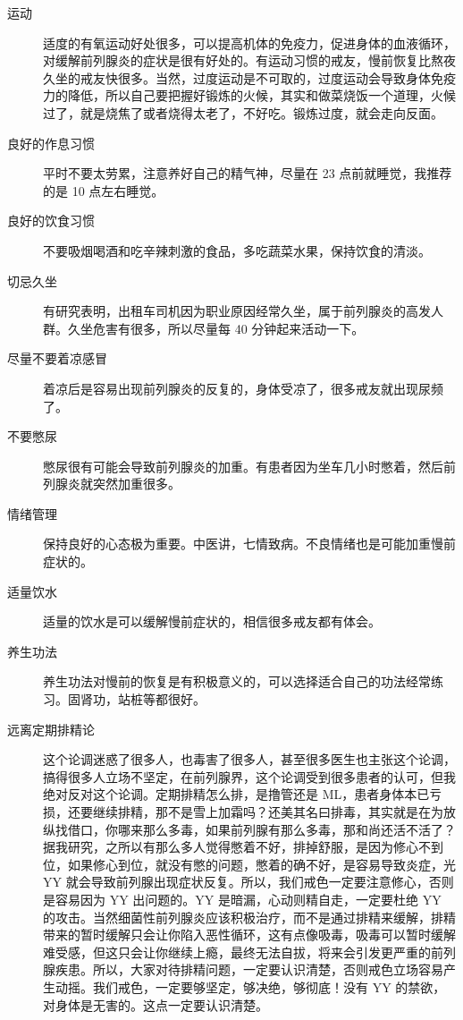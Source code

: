 \documentclass[fontset=founder]{ctexart}
\begin{document}
\begin{description}
    \item [运动] 适度的有氧运动好处很多，可以提高机体的免疫力，促进身体的血液循环，对缓解前列腺炎的症状是很有好处的。有运动习惯的戒友，慢前恢复比熬夜久坐的戒友快很多。当然，过度运动是不可取的，过度运动会导致身体免疫力的降低，所以自己要把握好锻炼的火候，其实和做菜烧饭一个道理，火候过了，就是烧焦了或者烧得太老了，不好吃。锻炼过度，就会走向反面。
    \item [良好的作息习惯] 平时不要太劳累，注意养好自己的精气神，尽量在 23 点前就睡觉，我推荐的是 10 点左右睡觉。
    \item [良好的饮食习惯] 不要吸烟喝酒和吃辛辣刺激的食品，多吃蔬菜水果，保持饮食的清淡。
    \item [切忌久坐] 有研究表明，出租车司机因为职业原因经常久坐，属于前列腺炎的高发人群。久坐危害有很多，所以尽量每 40 分钟起来活动一下。
    \item [尽量不要着凉感冒] 着凉后是容易出现前列腺炎的反复的，身体受凉了，很多戒友就出现尿频了。
    \item [不要憋尿] 憋尿很有可能会导致前列腺炎的加重。有患者因为坐车几小时憋着，然后前列腺炎就突然加重很多。
    \item [情绪管理] 保持良好的心态极为重要。中医讲，七情致病。不良情绪也是可能加重慢前症状的。
    \item [适量饮水] 适量的饮水是可以缓解慢前症状的，相信很多戒友都有体会。
    \item [养生功法] 养生功法对慢前的恢复是有积极意义的，可以选择适合自己的功法经常练习。固肾功，站桩等都很好。
    \item [远离定期排精论] 这个论调迷惑了很多人，也毒害了很多人，甚至很多医生也主张这个论调，搞得很多人立场不坚定，在前列腺界，这个论调受到很多患者的认可，但我绝对反对这个论调。定期排精怎么排，是撸管还是 ML，患者身体本已亏损，还要继续排精，那不是雪上加霜吗？还美其名曰排毒，其实就是在为放纵找借口，你哪来那么多毒，如果前列腺有那么多毒，那和尚还活不活了？据我研究，之所以有那么多人觉得憋着不好，排掉舒服，是因为修心不到位，如果修心到位，就没有憋的问题，憋着的确不好，是容易导致炎症，光 YY 就会导致前列腺出现症状反复。所以，我们戒色一定要注意修心，否则是容易因为 YY 出问题的。YY 是暗漏，心动则精自走，一定要杜绝 YY 的攻击。当然细菌性前列腺炎应该积极治疗，而不是通过排精来缓解，排精带来的暂时缓解只会让你陷入恶性循环，这有点像吸毒，吸毒可以暂时缓解难受感，但这只会让你继续上瘾，最终无法自拔，将来会引发更严重的前列腺疾患。所以，大家对待排精问题，一定要认识清楚，否则戒色立场容易产生动摇。我们戒色，一定要够坚定，够决绝，够彻底！没有 YY 的禁欲，对身体是无害的。这点一定要认识清楚。
\end{description}
\end{document}
